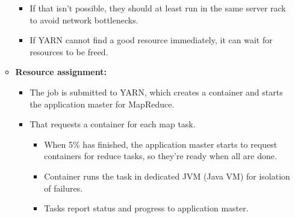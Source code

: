\begin{multicols}{2}
\begin{itemize}
\begin{itemize}
    \begin{itemize}
        \item
      If that isn't possible, they should at least run in the same
      server rack to avoid network bottlenecks.
    \item
      If YARN cannot find a good resource immediately, it can wait for
      resources to be freed.
    \end{itemize}
  \item
    \textbf{Resource assignment:}

    \begin{itemize}
        \item
      The job is submitted to YARN, which creates a container and starts
      the application master for MapReduce.
    \item
      That requests a container for each map task.

      \begin{itemize}
            \item
        When 5\% has finished, the application master starts to request
        containers for reduce tasks, so they're ready when all are done.
      \item
        Container runs the task in dedicated JVM (Java VM) for isolation
        of failures.
      \item
        Tasks report status and progress to application master.
      \end{itemize}
    \end{itemize}
  \end{itemize}
\end{itemize}
\end{multicols}